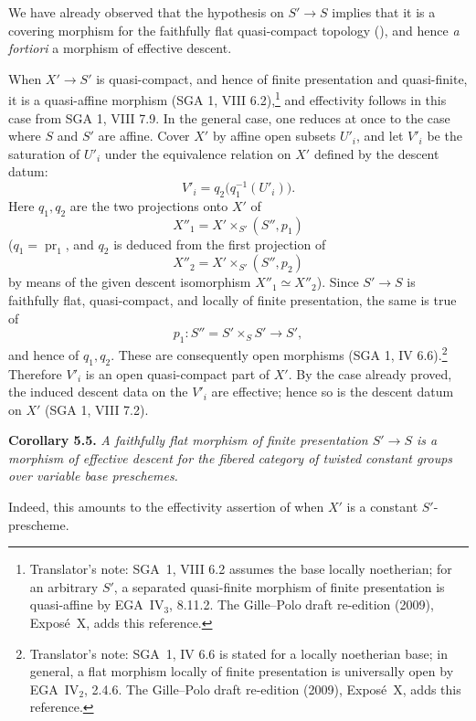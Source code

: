 We have already observed that the hypothesis on \(S'\to S\) implies that it
is a covering morphism for the faithfully flat quasi-compact topology
(), and hence \emph{a fortiori} a morphism of effective
descent.

When \(X'\to S'\) is quasi-compact, and hence of finite presentation and
quasi-finite, it is a quasi-affine morphism (SGA 1, VIII
6.2),\footnote{Translator's note: SGA~1, VIII 6.2 assumes the base locally
noetherian; for an arbitrary \(S'\), a separated quasi-finite morphism of
finite presentation is quasi-affine by EGA~IV\(_3\), 8.11.2. The Gille--Polo
draft re-edition (2009), Expos\'e~X, adds this reference.} and effectivity
follows in this case
from SGA 1, VIII 7.9. In the general case, one reduces at once to the case
where \(S\) and \(S'\) are affine. Cover \(X'\) by affine open subsets
\(U'_i\), and let \(V'_i\) be the saturation of \(U'_i\) under the
equivalence relation on \(X'\) defined by the descent datum:
\[
  V'_i=q_2\bigl(q_1^{-1}(U'_i)\bigr).
\]
Here \(q_1,q_2\) are the two projections onto \(X'\) of
\[
  X''_1=X'\times_{S'}(S'',p_1)
\]
(\(q_1=\operatorname{pr}_1\), and \(q_2\) is deduced from the first
projection of
\[
  X''_2=X'\times_{S'}(S'',p_2)
\]
by means of the given descent isomorphism \(X''_1\simeq X''_2\)). Since \(S'\to S\) is faithfully flat,
quasi-compact, and locally of finite presentation, the same is true of
\[
  p_1:S''=S'\times_S S'\longrightarrow S',
\]
and hence of \(q_1,q_2\). These are consequently open morphisms
(SGA 1, IV 6.6).\footnote{Translator's note: SGA~1, IV 6.6 is stated for a
locally noetherian base; in general, a flat morphism locally of finite
presentation is universally open by EGA~IV\(_2\), 2.4.6. The Gille--Polo
draft re-edition (2009), Expos\'e~X, adds this reference.} Therefore
\(V'_i\) is an
open quasi-compact part of \(X'\). By the case already proved, the induced
descent data on the \(V'_i\) are effective; hence so is the descent datum on
\(X'\) (SGA 1, VIII 7.2).

\par\medskip\noindent
\textbf{Corollary 5.5.}\enspace
\emph{A faithfully flat morphism of finite presentation \(S'\to S\) is a
morphism of effective descent for the fibered category of twisted constant
groups over variable base preschemes.}

Indeed, this amounts to the effectivity assertion of  when \(X'\) is a
constant \(S'\)-prescheme.

